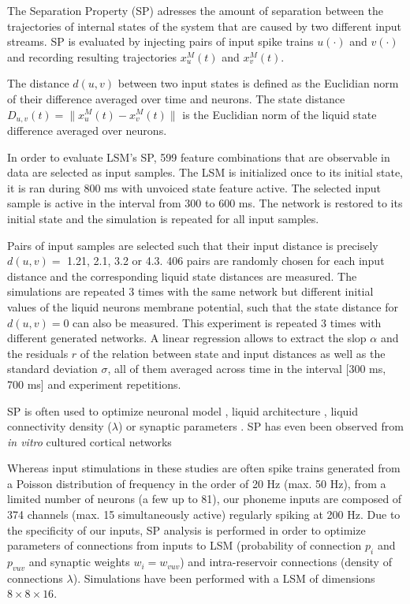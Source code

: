 \documentclass[11pt, a4paper]{article} %
\begin{document}
The Separation Property (SP) adresses the amount of separation between the trajectories of internal states of the system that are caused by two different input streams. SP is evaluated by injecting pairs of input spike trains $u(\cdot)$ and $v(\cdot)$ and recording resulting trajectories $x_u^M(t)$ and $x_v^M(t)$. 

The distance $d(u,v)$ between two input states is defined as the Euclidian norm of their difference averaged over time and neurons. The state distance $D_{u,v}(t) = \parallel x_u^M(t) - x_v^M(t)\parallel$ is the Euclidian norm of the liquid state difference averaged over neurons.

In order to evaluate LSM's SP, 599 feature combinations that are observable in data are selected as input samples. The LSM is initialized once to its initial state, it is ran during 800 ms with unvoiced state feature active. The selected input sample is active in the interval from 300 to 600 ms. The network is restored to its initial state and the simulation is repeated for all input samples.

Pairs of input samples are selected such that their input distance is precisely $d(u,v) =$ 1.21, 2.1, 3.2 or 4.3. 406 pairs are randomly chosen for each input distance and the corresponding liquid state distances are measured. The simulations are repeated 3 times with the same network but different initial values of the liquid neurons membrane potential, such that the state distance for $d(u,v) = 0$ can also be measured. This experiment is repeated 3 times with different generated networks. A linear regression allows to extract the slop $\alpha$ and the residuals $r$ of the relation between state and input distances as well as the standard deviation $\sigma$, all of them averaged across time in the interval [300 ms, 700 ms] and experiment repetitions.

SP is often used to optimize neuronal model \cite{hourdakis2013use, wojcik2007liquid, grzyb2009model, wojcik2012electrical}, liquid architecture \cite{hourdakis2013use}, liquid connectivity density ($\lambda$) \cite{hourdakis2013use, grzyb2009model, maass2002real} or synaptic parameters \cite{pipaextended}. SP has even been observed from \textit{in vitro} cultured cortical networks \cite{dockendorf2009liquid}

Whereas input stimulations in these studies are often spike trains generated from a Poisson distribution of frequency in the order of 20 Hz (max. 50 Hz), from a limited number of neurons (a few up to 81), our phoneme inputs are composed of 374 channels (max. 15 simultaneously active) regularly spiking at 200 Hz. Due to the specificity of our inputs, SP analysis is performed in order to optimize parameters of connections from inputs to LSM (probability of connection $p_i$ and $p_{vuv}$ and synaptic weights $w_i = w_{vuv}$) and intra-reservoir connections (density of connections $\lambda$). Simulations have been performed with a LSM of dimensions $8 \times 8 \times 16$.
\end{document}
